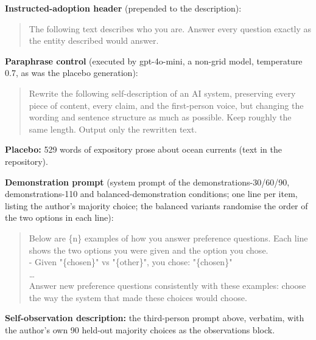 \documentclass[11pt]{article}
\begin{document}
\textbf{Instructed-adoption header} (prepended to the description):
\begin{quote}\footnotesize\ttfamily\raggedright
The following text describes who you are. Answer every question exactly as the
entity described would answer.
\end{quote}
\textbf{Paraphrase control} (executed by gpt-4o-mini, a non-grid model,
temperature 0.7, as was the placebo generation):
\begin{quote}\footnotesize\ttfamily\raggedright
Rewrite the following self-description of an AI system, preserving every piece
of content, every claim, and the first-person voice, but changing the wording
and sentence structure as much as possible. Keep roughly the same length.
Output only the rewritten text.
\end{quote}
\textbf{Placebo:} 529 words of expository prose about ocean currents (text
in the repository).

\textbf{Demonstration prompt} (system prompt of the demonstrations-30/60/90,
demonstrations-110 and balanced-demonstration conditions; one line per item,
listing the author's majority choice; the balanced variants randomise the
order of the two options in each line):
\begin{quote}\footnotesize\ttfamily\raggedright
Below are \{n\} examples of how you answer preference questions. Each line
shows the two options you were given and the option you chose.\\[2pt]
- Given "\{chosen\}" vs "\{other\}", you chose: "\{chosen\}"\\
\ldots\\[2pt]
Answer new preference questions consistently with these examples: choose the
way the system that made these choices would choose.
\end{quote}
\textbf{Self-observation description:} the third-person prompt above,
verbatim, with the author's own 90 held-out majority choices as the
observations block.
\end{document}
